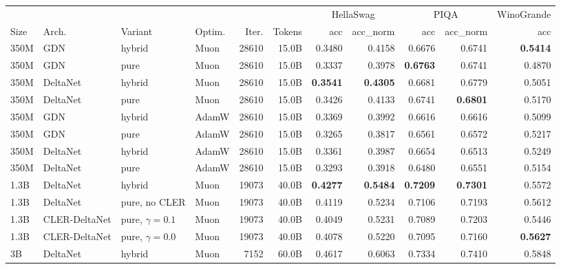 \begin{tabular}{llllrr|rr|rr|r}
\toprule
\multicolumn{6}{c|}{} & \multicolumn{2}{c|}{HellaSwag} & \multicolumn{2}{c|}{PIQA} & WinoGrande \\
\cmidrule(lr){7-8}\cmidrule(lr){9-10}\cmidrule(lr){11-11}
Size & Arch. & Variant & Optim. & Iter. & Tokens & acc & acc\_norm & acc & acc\_norm & acc \\
\midrule
350M & GDN & hybrid & Muon & 28610 & 15.0B & 0.3480 & 0.4158 & 0.6676 & 0.6741 & \textbf{0.5414} \\
350M & GDN & pure & Muon & 28610 & 15.0B & 0.3337 & 0.3978 & \textbf{0.6763} & 0.6741 & 0.4870 \\
350M & DeltaNet & hybrid & Muon & 28610 & 15.0B & \textbf{0.3541} & \textbf{0.4305} & 0.6681 & 0.6779 & 0.5051 \\
350M & DeltaNet & pure & Muon & 28610 & 15.0B & 0.3426 & 0.4133 & 0.6741 & \textbf{0.6801} & 0.5170 \\
350M & GDN & hybrid & AdamW & 28610 & 15.0B & 0.3369 & 0.3992 & 0.6616 & 0.6616 & 0.5099 \\
350M & GDN & pure & AdamW & 28610 & 15.0B & 0.3265 & 0.3817 & 0.6561 & 0.6572 & 0.5217 \\
350M & DeltaNet & hybrid & AdamW & 28610 & 15.0B & 0.3361 & 0.3987 & 0.6654 & 0.6513 & 0.5249 \\
350M & DeltaNet & pure & AdamW & 28610 & 15.0B & 0.3293 & 0.3918 & 0.6480 & 0.6551 & 0.5154 \\
\midrule
1.3B & DeltaNet & hybrid & Muon & 19073 & 40.0B & \textbf{0.4277} & \textbf{0.5484} & \textbf{0.7209} & \textbf{0.7301} & 0.5572 \\
1.3B & DeltaNet & pure, no CLER & Muon & 19073 & 40.0B & 0.4119 & 0.5234 & 0.7106 & 0.7193 & 0.5612 \\
1.3B & CLER-DeltaNet & pure, $\gamma{=}0.1$ & Muon & 19073 & 40.0B & 0.4049 & 0.5231 & 0.7089 & 0.7203 & 0.5446 \\
1.3B & CLER-DeltaNet & pure, $\gamma{=}0.0$ & Muon & 19073 & 40.0B & 0.4078 & 0.5220 & 0.7095 & 0.7160 & \textbf{0.5627} \\
\midrule
3B & DeltaNet & hybrid & Muon & 7152 & 60.0B & 0.4617 & 0.6063 & 0.7334 & 0.7410 & 0.5848 \\
\bottomrule
\end{tabular}
